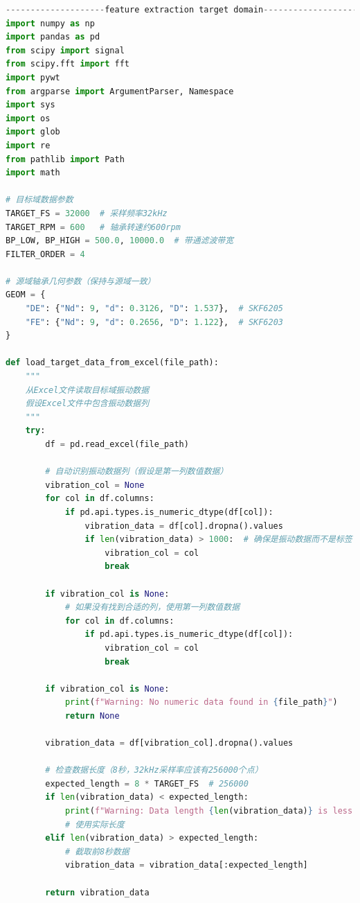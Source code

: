 \documentclass[a4paper]{CPIPC}
\numberwithin{equation}{section}
\begin{document}
\begin{lstlisting}[language=Python, caption=Target Domain Feature Extraction]
--------------------feature extraction target domain----------------------
import numpy as np
import pandas as pd
from scipy import signal
from scipy.fft import fft
import pywt
from argparse import ArgumentParser, Namespace
import sys
import os
import glob
import re
from pathlib import Path
import math

# 目标域数据参数
TARGET_FS = 32000  # 采样频率32kHz
TARGET_RPM = 600   # 轴承转速约600rpm
BP_LOW, BP_HIGH = 500.0, 10000.0  # 带通滤波带宽
FILTER_ORDER = 4

# 源域轴承几何参数（保持与源域一致）
GEOM = {
    "DE": {"Nd": 9, "d": 0.3126, "D": 1.537},  # SKF6205
    "FE": {"Nd": 9, "d": 0.2656, "D": 1.122},  # SKF6203
}    

def load_target_data_from_excel(file_path):
    """
    从Excel文件读取目标域振动数据
    假设Excel文件中包含振动数据列
    """
    try:
        df = pd.read_excel(file_path)
        
        # 自动识别振动数据列（假设是第一列数值数据）
        vibration_col = None
        for col in df.columns:
            if pd.api.types.is_numeric_dtype(df[col]):
                vibration_data = df[col].dropna().values
                if len(vibration_data) > 1000:  # 确保是振动数据而不是标签
                    vibration_col = col
                    break
        
        if vibration_col is None:
            # 如果没有找到合适的列，使用第一列数值数据
            for col in df.columns:
                if pd.api.types.is_numeric_dtype(df[col]):
                    vibration_col = col
                    break
        
        if vibration_col is None:
            print(f"Warning: No numeric data found in {file_path}")
            return None
        
        vibration_data = df[vibration_col].dropna().values
        
        # 检查数据长度（8秒，32kHz采样率应该有256000个点）
        expected_length = 8 * TARGET_FS  # 256000
        if len(vibration_data) < expected_length:
            print(f"Warning: Data length {len(vibration_data)} is less than expected {expected_length}")
            # 使用实际长度
        elif len(vibration_data) > expected_length:
            # 截取前8秒数据
            vibration_data = vibration_data[:expected_length]
        
        return vibration_data
        

\end{lstlisting}
\end{document}
